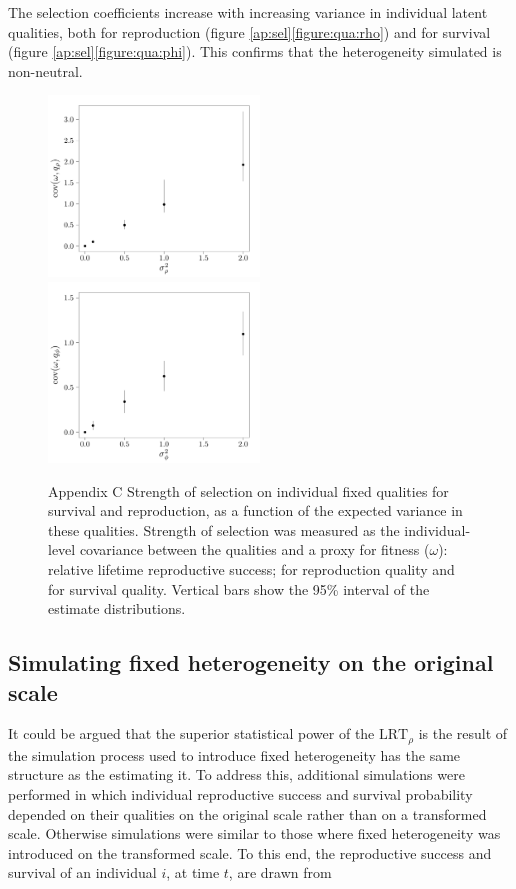 The selection coefficients increase with increasing variance in individual latent qualities, both for reproduction (figure \ref{ap:sel}\ref{figure:qua:rho}) and for survival (figure \ref{ap:sel}\ref{figure:qua:phi}). This confirms that the heterogeneity simulated is non-neutral. 

\begin{figure}[ht]

		{
			\includegraphics[width=0.5\textwidth]{FiguresDynHet/Figure5a}
			\label{figure:qua:rho}
		}
		{
			\includegraphics[width=0.5\textwidth]{FiguresDynHet/Figure5b}
			\label{figure:qua:phi}
		}
	\caption{ Appendix C \footnotesize Strength of selection on individual fixed qualities for survival and reproduction, as a function of the expected variance in these qualities. Strength of selection was measured as the individual-level covariance between the qualities and a proxy for fitness ($\omega$): relative lifetime reproductive success;  %
	for reproduction quality and %
	for survival quality. Vertical bars show the 95\% interval of the estimate distributions.}
	\label{figure:qua}
\end{figure}

\subsection{Simulating fixed heterogeneity on the original scale}\label{app:orsc}
It could be argued that the superior statistical power of the  $\mathrm{LRT}_{\rho}$ is the result of the simulation process used to introduce fixed heterogeneity has the same structure as the \MM estimating it. To address this, additional simulations were performed in which individual reproductive success and survival probability depended on their qualities on the original scale rather than on a transformed scale. Otherwise simulations were similar to those where fixed heterogeneity was introduced on the transformed scale. To this end, the reproductive success and survival of an individual $i$, at time $t$, are drawn from


